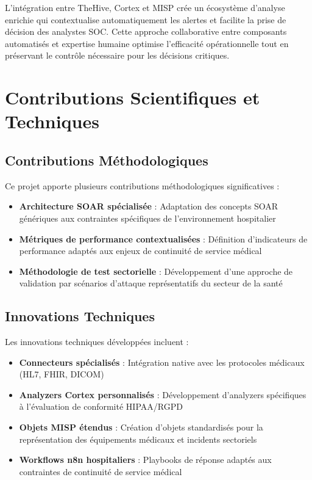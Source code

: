L'intégration entre TheHive, Cortex et MISP crée un écosystème d'analyse enrichie qui contextualise automatiquement les alertes et facilite la prise de décision des analystes SOC. Cette approche collaborative entre composants automatisés et expertise humaine optimise l'efficacité opérationnelle tout en préservant le contrôle nécessaire pour les décisions critiques.

\section{Contributions Scientifiques et Techniques}

\subsection{Contributions Méthodologiques}

Ce projet apporte plusieurs contributions méthodologiques significatives :

\begin{itemize}
    \item \textbf{Architecture SOAR spécialisée} : Adaptation des concepts SOAR génériques aux contraintes spécifiques de l'environnement hospitalier
    \item \textbf{Métriques de performance contextualisées} : Définition d'indicateurs de performance adaptés aux enjeux de continuité de service médical
    \item \textbf{Méthodologie de test sectorielle} : Développement d'une approche de validation par scénarios d'attaque représentatifs du secteur de la santé
\end{itemize}

\subsection{Innovations Techniques}

Les innovations techniques développées incluent :

\begin{itemize}
    \item \textbf{Connecteurs spécialisés} : Intégration native avec les protocoles médicaux (HL7, FHIR, DICOM)
    \item \textbf{Analyzers Cortex personnalisés} : Développement d'analyzers spécifiques à l'évaluation de conformité HIPAA/RGPD
    \item \textbf{Objets MISP étendus} : Création d'objets standardisés pour la représentation des équipements médicaux et incidents sectoriels
    \item \textbf{Workflows n8n hospitaliers} : Playbooks de réponse adaptés aux contraintes de continuité de service médical
\end{itemize}

